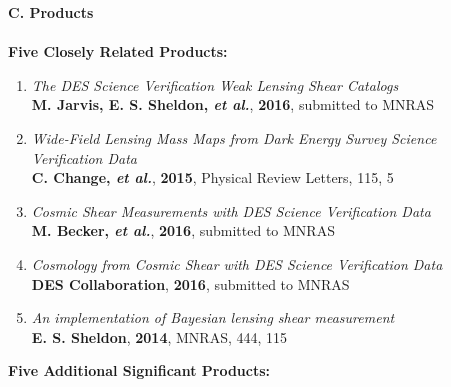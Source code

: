 \documentclass[10pt]{article}
\begin{document}
{\large \bf C. Products}\\
\vspace{-0.75em}\\
{\bf Five Closely Related Products:}
\begin{enumerate}

    \item \textit{The DES Science Verification Weak Lensing Shear Catalogs}\\
        {\bf M. Jarvis, E. S. Sheldon, {\em et al.}}, {\bf 2016}, submitted to MNRAS

    \item \textit{Wide-Field Lensing Mass Maps from Dark Energy Survey Science Verification Data}\\
        {\bf C. Change, {\em et al.}}, {\bf 2015}, Physical Review Letters, 115, 5

    \item \textit{Cosmic Shear Measurements with DES Science Verification Data}\\
        {\bf M. Becker, {\em et al.}}, {\bf 2016}, submitted to MNRAS
        
    \item \textit{Cosmology from Cosmic Shear with DES Science Verification Data}\\
        {\bf DES Collaboration}, {\bf 2016}, submitted to MNRAS

    \item \textit{An implementation of Bayesian lensing shear measurement}\\
        {\bf E. S. Sheldon}, {\bf 2014}, MNRAS, 444, 115


\end{enumerate}
{\bf Five Additional Significant Products:}
\vspace{-0.5em}
\end{document}
